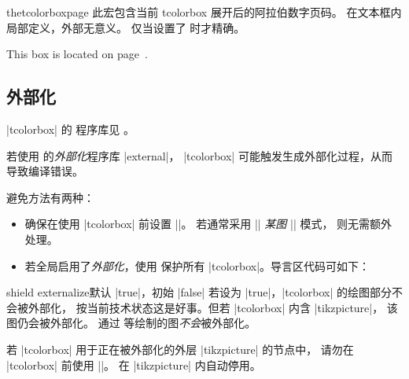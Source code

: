 \begin{docCommand}[doc new=2015-11-13]{thetcolorboxpage}{}
此宏包含当前 tcolorbox 展开后的阿拉伯数字页码。
在文本框内局部定义，外部无意义。
仅当设置了  时才精确。

\begin{dispExample}
\begin{tcolorbox}[colback=yellow!5,check odd page,
    title=Box on page~\thetcolorboxpage]
  This box is located on page~\thetcolorboxpage.
\end{tcolorbox}
\end{dispExample}
\end{docCommand}





\clearpage
\subsection{外部化}
\begin{marker}
|tcolorbox| 的  程序库见 。
\end{marker}

若使用  的\emph{外部化}程序库 |external|，
|tcolorbox| 可能触发生成外部化过程，从而导致编译错误。

避免方法有两种：
\begin{itemize}
\item 确保在使用 |tcolorbox| 前设置 |\tikzexternaldisable|。
  若通常采用 |\tikzexternalenable| \textit{某图} |\tikzexternaldisable| 模式，
  则无需额外处理。
\item 若全局启用了\emph{外部化}，使用 
  保护所有 |tcolorbox|。导言区代码可如下：
\begin{dispListing}
\usetikzlibrary{external}
\tikzexternalize
{}
\end{dispListing}
\end{itemize}

\begin{docTcbKey}{shield externalize}{}{默认 |true|，初始 |false|}
若设为 |true|，|tcolorbox| 的绘图部分不会被外部化，
按当前技术状态这是好事。但若 |tcolorbox| 内含 |tikzpicture|，
该图仍会被外部化。
通过  等绘制的图\emph{不会}被外部化。
\end{docTcbKey}

\begin{marker}
若 |tcolorbox| 用于正在被外部化的外层 |tikzpicture| 的节点中，
请勿在 |tcolorbox| 前使用 |\tikzexternaldisable|。
 在 |tikzpicture| 内自动停用。
\end{marker}

